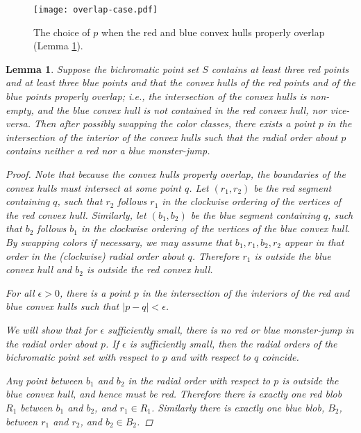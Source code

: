 \documentclass[12pt]{article}
\newtheorem{lemma}{Lemma}
\theoremstyle{definition}
\begin{document}
\begin{figure}
\centering
\texttt{[image: overlap-case.pdf]}
\caption{The choice of $p$ when the red and blue convex hulls properly overlap (Lemma \ref{lem:no-monster-jump-overlap}).}
\label{fig:overlap-case}
\end{figure}

\begin{lemma}
  \label{lem:no-monster-jump-overlap}
  Suppose the bichromatic point set $S$ contains at least three red points and at least three blue points and that the convex hulls of the red points and of the blue points properly overlap; i.e., the intersection of the convex hulls is non-empty, and the blue convex hull is not contained in the red convex hull, nor vice-versa.
  Then after possibly swapping the color classes, there exists a point $p$ in the intersection of the interior of the convex hulls such that the radial order about $p$ contains neither a red nor a blue monster-jump.
  \begin{proof}
    Note that because the convex hulls properly overlap, the boundaries of the convex hulls must intersect at some point $q$.
    Let $(r_1,r_2)$ be the red segment containing $q$, such that $r_2$ follows $r_1$ in the clockwise ordering of the vertices of the red convex hull.
    Similarly, let $(b_1,b_2)$ be the blue segment containing $q$, such that $b_2$ follows $b_1$ in the clockwise ordering of the vertices of the blue convex hull.
    By swapping colors if necessary, we may assume that $b_1,r_1,b_2,r_2$ appear in that order in the (clockwise) radial order about $q$.
    Therefore $r_1$ is outside the blue convex hull and $b_2$ is outside the red convex hull.

    For all $\epsilon>0$, there is a point $p$ in the intersection of the interiors of the red and blue convex hulls such that $|p-q|<\epsilon$.

    We will show that for $\epsilon$ sufficiently small, there is no red or blue monster-jump in the radial order about $p$.
    If $\epsilon$ is sufficiently small, then the radial orders of the bichromatic point set with respect to $p$ and with respect to $q$ coincide.
    
    Any point between $b_1$ and $b_2$ in the radial order with respect to $p$ is outside the blue convex hull, and hence must be red.
    Therefore there is exactly one red blob $R_1$ between $b_1$ and $b_2$, and $r_1\in R_1$.
    Similarly there is exactly one blue blob, $B_2$, between $r_1$ and $r_2$, and $b_2\in B_2$.


\end{proof}
\end{lemma}
\end{document}
